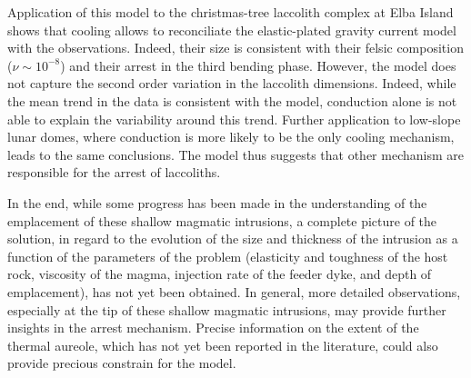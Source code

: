 Application of this  model to the christmas-tree  laccolith complex at
Elba   Island  shows   that   cooling  allows   to  reconciliate   the
elastic-plated gravity  current model  with the  observations. Indeed,
their   size    is   consistent   with   their    felsic   composition
($\nu  \sim   10^{-8}$)  and  their   arrest  in  the   third  bending
phase. However, the model does  not capture the second order variation
in the laccolith dimensions. Indeed, while  the mean trend in the data
is consistent with the model, conduction  alone is not able to explain
the variability  around this trend.  Further  application to low-slope
lunar domes,  where conduction is more  likely to be the  only cooling
mechanism, leads  to the  same conclusions.   The model  thus suggests
that other mechanism are responsible for the arrest of laccoliths.

In the end, while some progress  has been made in the understanding of
the  emplacement  of these  shallow  magmatic  intrusions, a  complete
picture of  the solution, in regard  to the evolution of  the size and
thickness of  the intrusion  as a  function of  the parameters  of the
problem (elasticity and  toughness of the host rock,  viscosity of the
magma, injection rate  of the feeder dyke, and  depth of emplacement),
has not  yet been obtained.   In general, more  detailed observations,
especially  at  the tip  of  these  shallow magmatic  intrusions,  may
provide further insights in the arrest mechanism.  Precise information
on the extent of the thermal  aureole, which has not yet been reported
in  the literature,  could  also provide  precious  constrain for  the
model.


